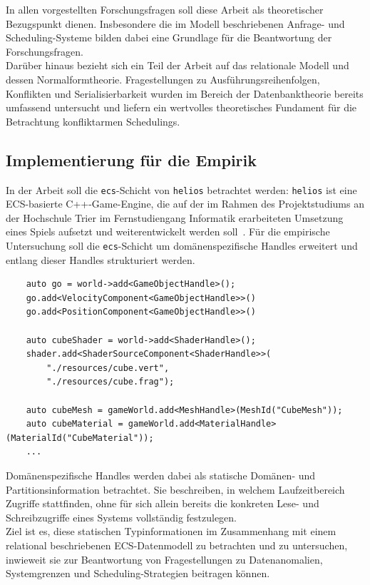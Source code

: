 In allen vorgestellten Forschungsfragen soll diese Arbeit als theoretischer Bezugspunkt dienen.
Insbesondere die im Modell beschriebenen Anfrage- und Scheduling-Systeme bilden dabei eine Grundlage für die Beantwortung der Forschungsfragen.\\

Darüber hinaus bezieht sich ein Teil der Arbeit auf das relationale Modell und dessen Normalformtheorie.
Fragestellungen zu Ausführungsreihenfolgen, Konflikten und Serialisierbarkeit wurden im Bereich der Datenbanktheorie bereits umfassend untersucht und liefern ein wertvolles theoretisches Fundament für die Betrachtung konfliktarmen Schedulings.

\subsection*{Implementierung für die Empirik}

In der Arbeit soll die \texttt{ecs}-Schicht von \texttt{helios} betrachtet werden:
\texttt{helios} ist eine ECS-basierte C++-Game-Engine, die auf der im Rahmen des Projektstudiums an der Hochschule Trier im Fernstudiengang Informatik erarbeiteten Umsetzung eines Spiels aufsetzt und weiterentwickelt werden soll~\cite{Suc26}.
Für die empirische Untersuchung soll die \texttt{ecs}-Schicht um domänenspezifische Handles erweitert und entlang dieser Handles strukturiert werden.\\

\begin{verbatim}
    auto go = world->add<GameObjectHandle>();
    go.add<VelocityComponent<GameObjectHandle>>()
    go.add<PositionComponent<GameObjectHandle>>()

    auto cubeShader = world->add<ShaderHandle>();
    shader.add<ShaderSourceComponent<ShaderHandle>>(
        "./resources/cube.vert",
        "./resources/cube.frag");

    auto cubeMesh = gameWorld.add<MeshHandle>(MeshId("CubeMesh"));
    auto cubeMaterial = gameWorld.add<MaterialHandle>(MaterialId("CubeMaterial"));
    ...
\end{verbatim}

Domänenspezifische Handles werden dabei als statische Domänen- und Partitionsinformation betrachtet.
Sie beschreiben, in welchem Laufzeitbereich Zugriffe stattfinden, ohne für sich allein bereits die konkreten Lese- und Schreibzugriffe eines Systems vollständig festzulegen.\\

Ziel ist es, diese statischen Typinformationen im Zusammenhang mit einem relational beschriebenen ECS-Datenmodell zu betrachten und zu untersuchen, inwieweit sie zur Beantwortung von Fragestellungen zu Datenanomalien, Systemgrenzen und Scheduling-Strategien beitragen können.\\


